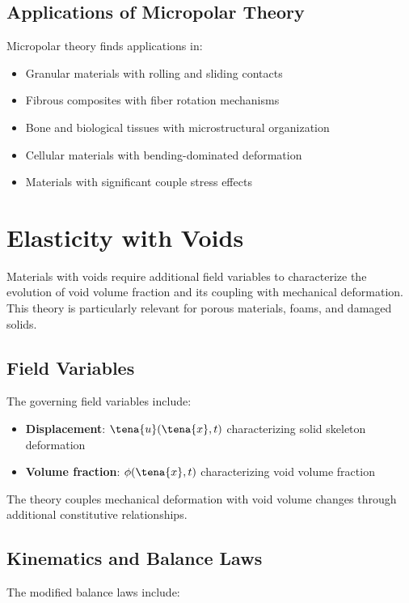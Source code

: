 \subsection{Applications of Micropolar Theory}

Micropolar theory finds applications in:
\begin{itemize}
\item Granular materials with rolling and sliding contacts
\item Fibrous composites with fiber rotation mechanisms
\item Bone and biological tissues with microstructural organization
\item Cellular materials with bending-dominated deformation
\item Materials with significant couple stress effects
\end{itemize}

\section{Elasticity with Voids}

Materials with voids require additional field variables to characterize the evolution of void volume fraction and its coupling with mechanical deformation. This theory is particularly relevant for porous materials, foams, and damaged solids.

\subsection{Field Variables}

The governing field variables include:
\begin{itemize}
\item \textbf{Displacement}: $\tena{u}(\tena{x}, t)$ characterizing solid skeleton deformation
\item \textbf{Volume fraction}: $\phi(\tena{x}, t)$ characterizing void volume fraction
\end{itemize}

The theory couples mechanical deformation with void volume changes through additional constitutive relationships.

\subsection{Kinematics and Balance Laws}

The modified balance laws include:

